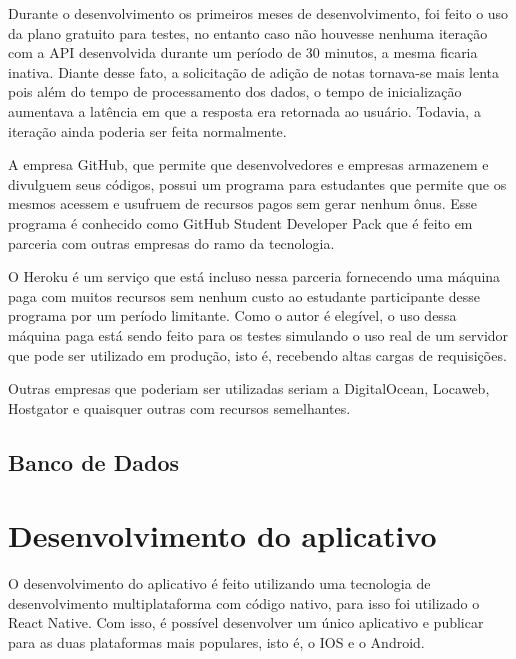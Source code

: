 Durante o desenvolvimento os primeiros meses de desenvolvimento, foi feito o uso da plano gratuito para testes, no entanto caso não houvesse nenhuma iteração com a API desenvolvida durante um período de 30 minutos, a mesma ficaria inativa. Diante desse fato, a solicitação de adição de notas tornava-se mais lenta pois além do tempo de processamento dos dados, o tempo de inicialização aumentava a latência em que a resposta era retornada ao usuário. Todavia, a iteração ainda poderia ser feita normalmente.

A empresa GitHub, que permite que desenvolvedores e empresas armazenem e divulguem seus códigos, possui um programa para estudantes que permite que os mesmos acessem e usufruem de recursos pagos sem gerar nenhum ônus. Esse programa é conhecido como GitHub Student Developer Pack que é feito em parceria com outras empresas do ramo da tecnologia.

O Heroku é um serviço que está incluso nessa parceria fornecendo uma máquina paga com muitos recursos sem nenhum custo ao estudante participante desse programa por um período limitante. Como o autor é elegível, o uso dessa máquina paga está sendo feito para os testes simulando o uso real de um servidor que pode ser utilizado em produção, isto é, recebendo altas cargas de requisições.

Outras empresas que poderiam ser utilizadas seriam a DigitalOcean, Locaweb, Hostgator e quaisquer outras com recursos semelhantes.

\subsection{Banco de Dados}


\section{Desenvolvimento do aplicativo}\label{desenvApp}

O desenvolvimento do aplicativo é feito utilizando uma tecnologia de desenvolvimento multiplataforma com código nativo, para isso foi utilizado o React Native. Com isso, é possível desenvolver um único aplicativo e publicar para as duas plataformas mais populares, isto é, o IOS e o Android.

